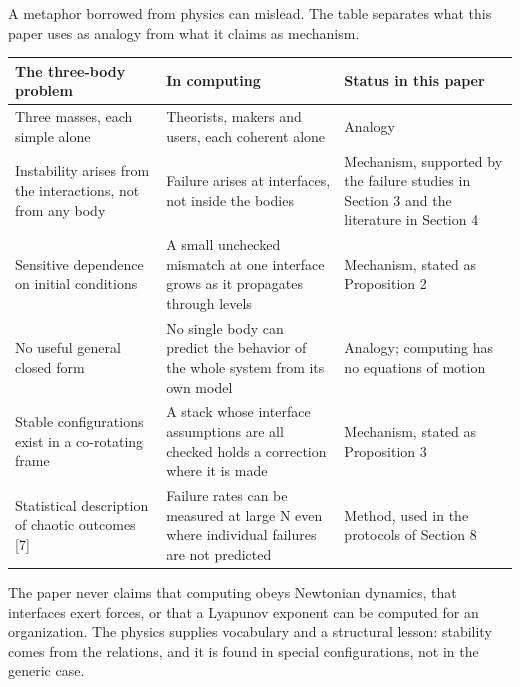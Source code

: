 \documentclass[
  10pt,
]{article}
\newcounter{none} %
\begin{document}
A metaphor borrowed from physics can mislead. The table separates what
this paper uses as analogy from what it claims as mechanism.

{\def\LTcaptype{none} %
\begin{longtable}[]{@{}
  >{\raggedright\arraybackslash}p{}
  >{\raggedright\arraybackslash}p{}
  >{\raggedright\arraybackslash}p{}@{}}
\toprule\noalign{}
\begin{minipage}[b]{\linewidth}\raggedright
The three-body problem
\end{minipage} & \begin{minipage}[b]{\linewidth}\raggedright
In computing
\end{minipage} & \begin{minipage}[b]{\linewidth}\raggedright
Status in this paper
\end{minipage} \\
\midrule\noalign{}
\endhead
\bottomrule\noalign{}
\endlastfoot
Three masses, each simple alone & Theorists, makers and users, each
coherent alone & Analogy \\
Instability arises from the interactions, not from any body & Failure
arises at interfaces, not inside the bodies & Mechanism, supported by
the failure studies in Section 3 and the literature in Section 4 \\
Sensitive dependence on initial conditions & A small unchecked mismatch
at one interface grows as it propagates through levels & Mechanism,
stated as Proposition 2 \\
No useful general closed form & No single body can predict the behavior
of the whole system from its own model & Analogy; computing has no
equations of motion \\
Stable configurations exist in a co-rotating frame & A stack whose
interface assumptions are all checked holds a correction where it is
made & Mechanism, stated as Proposition 3 \\
Statistical description of chaotic outcomes {[}7{]} & Failure rates can
be measured at large N even where individual failures are not predicted
& Method, used in the protocols of Section 8 \\
\end{longtable}
}

The paper never claims that computing obeys Newtonian dynamics, that
interfaces exert forces, or that a Lyapunov exponent can be computed for
an organization. The physics supplies vocabulary and a structural
lesson: stability comes from the relations, and it is found in special
configurations, not in the generic case.
\end{document}
